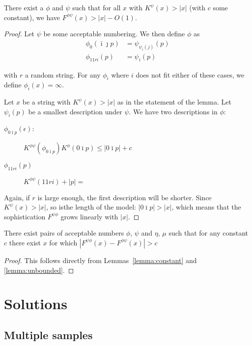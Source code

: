 \documentclass{style/llncs}
\begin{document}
\begin{lemma}
There exist a $\phi$ and $\psi$ such that for all $x$ with $K^\psi(x) > |x|$ (with $c$ some constant), we have $F^{\phi\psi}(x) > |x| - O(1)$. \label{lemma:unbounded}
\end{lemma}
\begin{proof}
Let $\psi$ be some acceptable numbering. We then define $\phi$ as
\begin{align*}
\phi_0(\bar\imath\jmath p) &= \psi_{\psi_i(j)}(p) \\
\phi_{11ri}(p) &= \psi_i(p)
\end{align*}

with $r$ a random string. For any $\phi_i$ where $i$ does not fit either of these cases, we define $\phi_i(x) = \infty$. 

Let $x$ be a string with $K^\psi(x) > |x|$ as in the statement of the lemma. Let $\psi_i(p)$ be a smallest description under $\psi$. We have two descriptions in $\phi$:

\begin{description}
\item[$\phi_{0\bar\imath p}(\epsilon)$:] $K^{\phi\psi}(\phi_{0\bar\imath p}) K^{\phi}(0\bar\imath p) \leq |0\bar\imath p| + c$
\item[$\phi_{11ri}(p)$] $K^{\phi\psi}(11ri) + |p| = $  
\end{description}

Again, if $r$ is large enough, the first description will be shorter. Since $K^\psi(x) > |x|$, so isthe length of the model: $|0\bar\imath p | > |x|$, which means that the sophistication $F^{\psi\phi}$ grows linearly with $|x|$.

\end{proof}
\begin{theorem}
There exist pairs of acceptable numbers $\phi$, $\psi$ and $\eta$, $\mu$ such that for any constant $c$ there exist $x$ for which $\left|F^{\psi\phi}(x) -F^{\phi\psi}(x)\right| > c$ 
\end{theorem}
\begin{proof}
This follows directly from Lemmas~\ref{lemma:constant} and \ref{lemma:unbounded}.
\end{proof}

\section{Solutions}

\subsection{Multiple samples}
\end{document}

